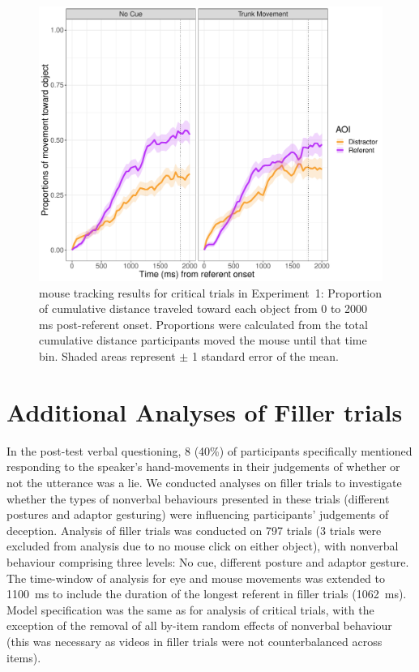 \documentclass[a4paper,man,natbib]{apa6}
\begin{document}
\begin{figure}[Ht]
  \centering
	\includegraphics[width=\linewidth]{./img/e7_mouse_crit.pdf}
  \caption{mouse tracking results for critical trials in Experiment~1: Proportion of cumulative distance traveled toward each object from 0 to 2000 ms post-referent onset. Proportions were calculated from the total cumulative distance participants moved the mouse until that time bin. Shaded areas represent $\pm$ 1 standard error of the mean.}
  \label{fig:v1_mouse1}
\end{figure}

\section{Additional Analyses of Filler trials}
In the post-test verbal questioning, 8 (40\%) of participants specifically mentioned responding to the speaker's hand-movements in their judgements of whether or not the utterance was a lie. 
We conducted analyses on filler trials to investigate whether the types of nonverbal behaviours presented in these trials (different postures and adaptor gesturing) were influencing participants' judgements of deception.
Analysis of filler trials was conducted on 797 trials (3 trials were excluded from analysis due to no mouse click on either object), with nonverbal behaviour comprising three levels: No cue, different posture and adaptor gesture.
The time-window of analysis for eye  and mouse  movements was extended to 1100~ms to include the duration of the longest referent in filler trials (1062~ms).
Model specification was the same as for analysis of critical trials, with the exception of the removal of all by-item random effects of nonverbal behaviour (this was necessary as videos in filler trials were not counterbalanced across items).
\end{document}
